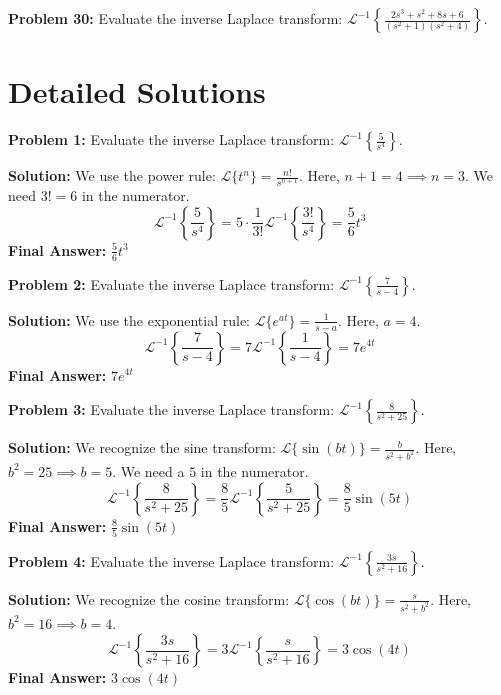 \documentclass[11pt, letterpaper]{article}
\theoremstyle{definition}
\theoremstyle{remark}
\begin{document}
\textbf{Problem 30:} Evaluate the inverse Laplace transform: $\displaystyle \mathcal{L}^{-1} \left\{ \frac{2s^3 + s^2 + 8s + 6}{(s^2+1)(s^2+4)} \right\}$.

\newpage

\section{Detailed Solutions}

\textbf{Problem 1:} Evaluate the inverse Laplace transform: $\displaystyle \mathcal{L}^{-1} \left\{ \frac{5}{s^4} \right\}$.

\textbf{Solution:} 
We use the power rule: $\mathcal{L}\{t^n\} = \frac{n!}{s^{n+1}}$. Here, $n+1 = 4 \implies n = 3$. We need $3! = 6$ in the numerator.
\[
\mathcal{L}^{-1} \left\{ \frac{5}{s^4} \right\} = 5 \cdot \frac{1}{3!} \mathcal{L}^{-1} \left\{ \frac{3!}{s^4} \right\} = \frac{5}{6} t^3
\]
\textbf{Final Answer:} $\displaystyle \frac{5}{6} t^3$

\vspace{1em}

\textbf{Problem 2:} Evaluate the inverse Laplace transform: $\displaystyle \mathcal{L}^{-1} \left\{ \frac{7}{s-4} \right\}$.

\textbf{Solution:}
We use the exponential rule: $\mathcal{L}\{e^{at}\} = \frac{1}{s-a}$. Here, $a = 4$.
\[
\mathcal{L}^{-1} \left\{ \frac{7}{s-4} \right\} = 7 \mathcal{L}^{-1} \left\{ \frac{1}{s-4} \right\} = 7e^{4t}
\]
\textbf{Final Answer:} $\displaystyle 7e^{4t}$

\vspace{1em}

\textbf{Problem 3:} Evaluate the inverse Laplace transform: $\displaystyle \mathcal{L}^{-1} \left\{ \frac{8}{s^2 + 25} \right\}$.

\textbf{Solution:}
We recognize the sine transform: $\mathcal{L}\{\sin(bt)\} = \frac{b}{s^2+b^2}$. Here, $b^2 = 25 \implies b = 5$. We need a $5$ in the numerator.
\[
\mathcal{L}^{-1} \left\{ \frac{8}{s^2 + 25} \right\} = \frac{8}{5} \mathcal{L}^{-1} \left\{ \frac{5}{s^2 + 25} \right\} = \frac{8}{5} \sin(5t)
\]
\textbf{Final Answer:} $\displaystyle \frac{8}{5} \sin(5t)$

\vspace{1em}

\textbf{Problem 4:} Evaluate the inverse Laplace transform: $\displaystyle \mathcal{L}^{-1} \left\{ \frac{3s}{s^2 + 16} \right\}$.

\textbf{Solution:}
We recognize the cosine transform: $\mathcal{L}\{\cos(bt)\} = \frac{s}{s^2+b^2}$. Here, $b^2 = 16 \implies b = 4$.
\[
\mathcal{L}^{-1} \left\{ \frac{3s}{s^2 + 16} \right\} = 3 \mathcal{L}^{-1} \left\{ \frac{s}{s^2 + 16} \right\} = 3 \cos(4t)
\]
\textbf{Final Answer:} $\displaystyle 3 \cos(4t)$
\end{document}
